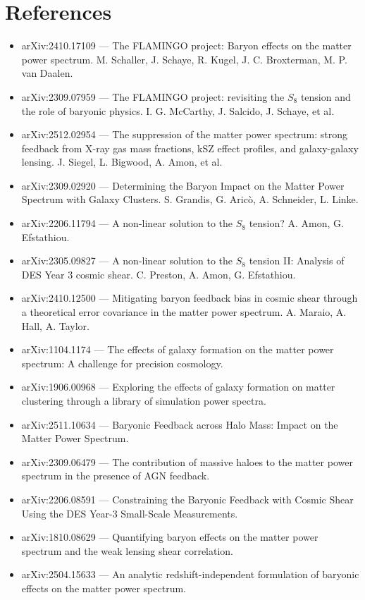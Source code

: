 \documentclass[11pt,a4paper]{article}
\begin{document}
\section*{References}
\begin{itemize}
\item arXiv:2410.17109 --- The FLAMINGO project: Baryon effects on the matter power spectrum. M. Schaller, J. Schaye, R. Kugel, J. C. Broxterman, M. P. van Daalen.
\item arXiv:2309.07959 --- The FLAMINGO project: revisiting the $S_8$ tension and the role of baryonic physics. I. G. McCarthy, J. Salcido, J. Schaye, et al.
\item arXiv:2512.02954 --- The suppression of the matter power spectrum: strong feedback from X-ray gas mass fractions, kSZ effect profiles, and galaxy-galaxy lensing. J. Siegel, L. Bigwood, A. Amon, et al.
\item arXiv:2309.02920 --- Determining the Baryon Impact on the Matter Power Spectrum with Galaxy Clusters. S. Grandis, G. Aricò, A. Schneider, L. Linke.
\item arXiv:2206.11794 --- A non-linear solution to the $S_8$ tension? A. Amon, G. Efstathiou.
\item arXiv:2305.09827 --- A non-linear solution to the $S_8$ tension II: Analysis of DES Year 3 cosmic shear. C. Preston, A. Amon, G. Efstathiou.
\item arXiv:2410.12500 --- Mitigating baryon feedback bias in cosmic shear through a theoretical error covariance in the matter power spectrum. A. Maraio, A. Hall, A. Taylor.
\item arXiv:1104.1174 --- The effects of galaxy formation on the matter power spectrum: A challenge for precision cosmology.
\item arXiv:1906.00968 --- Exploring the effects of galaxy formation on matter clustering through a library of simulation power spectra.
\item arXiv:2511.10634 --- Baryonic Feedback across Halo Mass: Impact on the Matter Power Spectrum.
\item arXiv:2309.06479 --- The contribution of massive haloes to the matter power spectrum in the presence of AGN feedback.
\item arXiv:2206.08591 --- Constraining the Baryonic Feedback with Cosmic Shear Using the DES Year-3 Small-Scale Measurements.
\item arXiv:1810.08629 --- Quantifying baryon effects on the matter power spectrum and the weak lensing shear correlation.
\item arXiv:2504.15633 --- An analytic redshift-independent formulation of baryonic effects on the matter power spectrum.
\end{itemize}
\end{document}
